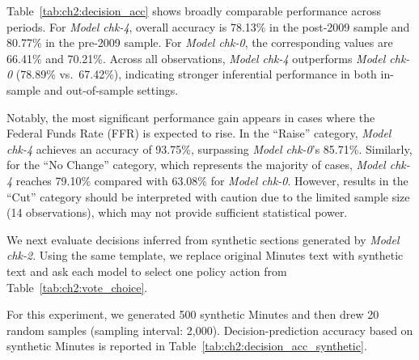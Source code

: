 Table~\ref{tab:ch2:decision_acc} shows broadly comparable performance across periods. For \textit{Model chk-4}, overall accuracy is 78.13\% in the post-2009 sample and 80.77\% in the pre-2009 sample. For \textit{Model chk-0}, the corresponding values are 66.41\% and 70.21\%. Across all observations, \textit{Model chk-4} outperforms \textit{Model chk-0} (78.89\% vs.\ 67.42\%), indicating stronger inferential performance in both in-sample and out-of-sample settings.

Notably, the most significant performance gain appears in cases where the Federal Funds Rate (FFR) is expected to rise. In the ``Raise'' category, \textit{Model chk-4} achieves an accuracy of 93.75\%, surpassing \textit{Model chk-0}'s 85.71\%. Similarly, for the ``No Change'' category, which represents the majority of cases, \textit{Model chk-4} reaches 79.10\% compared with 63.08\% for \textit{Model chk-0}. However, results in the “Cut” category should be interpreted with caution due to the limited sample size (14 observations), which may not provide sufficient statistical power.


We next evaluate decisions inferred from synthetic sections generated by \textit{Model chk-2}. Using the same template, we replace original Minutes text with synthetic text and ask each model to select one policy action from Table~\ref{tab:ch2:vote_choice}.


For this experiment, we generated 500 synthetic Minutes and then drew 20 random samples (sampling interval: 2,000). Decision-prediction accuracy based on synthetic Minutes is reported in Table~\ref{tab:ch2:decision_acc_synthetic}.


